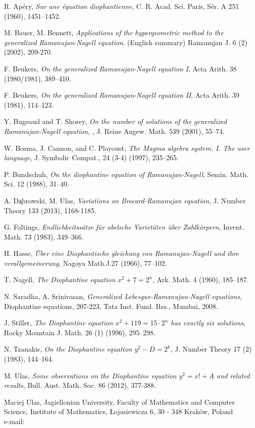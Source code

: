 \documentclass[10pt]{amsart}
\theoremstyle{plain}
\begin{document}
\begin{thebibliography}{100}
 R. Ap\'{e}ry, {\it Sur une \'{e}quation diophantienne}, C. R. Acad. Sci. Paris, S\'{e}r. A 251 (1960), 1451--1452.

M. Bauer, M. Bennett, {\it Applications of the hypergeometric method to the generalized Ramanujan-Nagell equation}. (English summary)
Ramanujan J. 6 (2) (2002), 209-270.

 F. Beukers, {\it On the generalized Ramanujan-Nagell equation I}, Acta Arith. 38 (1980/1981), 389--410.

 F. Beukers, {\it On the generalized Ramanujan-Nagell equation II}, Acta Arith. 39 (1981), 114--123.

 Y. Bugeaud and T. Shorey, {\it On the number of solutions of the generalized Ramanujan-Nagell equation,
}, J. Reine Angew. Math. 539 (2001), 55--74.

 W. Bosma, J. Cannon, and C. Playoust, {\it The Magma algebra system.
I. The user language}, J. Symbolic Comput., 24 (3-4) (1997), 235--265.

 P. Bundschuh, {\it On the diophantine equation of Ramanujan-Nagell}, Semin. Math. Sci. 12 (1988), 31--40.

 A. D\c{a}browski, M. Ulas, {\it Variations on Brocard-Ramanujan equation}, J. Number Theory 133 (2013), 1168-1185.

 G. Faltings, {\it Endlichkeitss\"{a}tze f\"{u}r abelsche Variet\"{a}ten \"{u}ber Zahlk\"{o}rpern}, Invent. Math. 73 (1983),
349--366.

 H. Hasse, {\it \"{U}ber eine Diophantische gleichung von Ramanujan-Nagell und ihre verallgemeinerung}, Nagoya Math.J.27 (1966), 77--102.

 T. Nagell, {\it The Diophantine equation $x^2+7=2^n$}, Ark. Math. 4 (1960), 185--187.

 N. Saradha, A. Srinivasan, {\it Generalized Lebesgue-Ramanujan-Nagell equations},  Diophantine equations, 207-223, Tata Inst. Fund. Res., Mumbai, 2008.

 J. Stiller, {\it The Diophantine equation $x^2+119=15\cdot 2^{n}$ has exactly six solutions}, Rocky Mountain J. Math. 26 (1) (1996), 295--298.

 N. Tzanakis, {\it On the Diophantine equation $y^2-D=2^{k}$}, J. Number Theory 17 (2) (1983), 144--164.

 M. Ulas, {\it Some observations on the Diophantine equation $y^2 = x! + A$ and related results}, Bull. Aust. Math. Soc. 86 (2012), 377-388.

\end{thebibliography}

 \bigskip

\noindent  Maciej Ulas, Jagiellonian University, Faculty of Mathematics and Computer Science, Institute of Mathematics, {\L}ojasiewicza 6, 30 - 348 Krak\'{o}w, Poland\\
e-mail:

 
\end{document}
